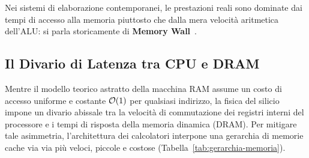 Nei sistemi di elaborazione contemporanei, le prestazioni reali sono dominate dai tempi di accesso alla memoria piuttosto che dalla mera velocit\`a aritmetica dell'ALU: si parla storicamente di \textbf{Memory Wall}~\cite{bakhvalov2024,slotin2023}.

\FloatBarrier
\subsection{Il Divario di Latenza tra CPU e DRAM}
\label{subsec:divario-latenza-cpu-dram}

Mentre il modello teorico astratto della macchina RAM assume un costo di accesso uniforme e costante $\mathcal{O}\!\left(1\right)$ per qualsiasi indirizzo, la fisica del silicio impone un divario abissale tra la velocit\`a di commutazione dei registri interni del processore e i tempi di risposta della memoria dinamica (DRAM). Per mitigare tale asimmetria, l'architettura dei calcolatori interpone una gerarchia di memorie cache via via pi\`u veloci, piccole e costose (Tabella~\ref{tab:gerarchia-memoria}).

\begin{table}[H]
\centering
\small
{}
\caption{Confronto quantitativo di latenze, cicli di clock e capacit\`a nella gerarchia di memoria di un moderno processore server x86\_64~\cite{bakhvalov2024,slotin2023}.}
\label{tab:gerarchia-memoria}
\end{table}

